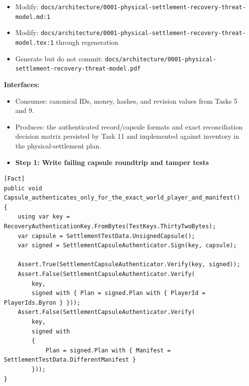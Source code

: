 \documentclass[
  10pt,
  letterpaper,
]{article}
\providecommand{\tightlist}{%
  \setlength{\itemsep}{0pt}\setlength{\parskip}{0pt}}
\begin{document}
\begin{itemize}
\item
  Modify:
  \texttt{docs/}\allowbreak{}\texttt{architecture/}\allowbreak{}\texttt{0001-}\allowbreak{}\texttt{physical-}\allowbreak{}\texttt{settlement-}\allowbreak{}\texttt{recovery-}\allowbreak{}\texttt{threat-}\allowbreak{}\texttt{model.}\allowbreak{}\texttt{md:}\allowbreak{}\texttt{1}
\item
  Modify:
  \texttt{docs/}\allowbreak{}\texttt{architecture/}\allowbreak{}\texttt{0001-}\allowbreak{}\texttt{physical-}\allowbreak{}\texttt{settlement-}\allowbreak{}\texttt{recovery-}\allowbreak{}\texttt{threat-}\allowbreak{}\texttt{model.}\allowbreak{}\texttt{tex:}\allowbreak{}\texttt{1}
  through regeneration
\item
  Generate but do not commit:
  \texttt{docs/}\allowbreak{}\texttt{architecture/}\allowbreak{}\texttt{0001-}\allowbreak{}\texttt{physical-}\allowbreak{}\texttt{settlement-}\allowbreak{}\texttt{recovery-}\allowbreak{}\texttt{threat-}\allowbreak{}\texttt{model.}\allowbreak{}\texttt{pdf}
\end{itemize}

\textbf{Interfaces:}

\begin{itemize}
\tightlist
\item
  Consumes: canonical IDs, money, hashes, and revision values from Tasks
  5 and 9.
\item
  Produces: the authenticated record/capsule formats and exact
  reconciliation decision matrix persisted by Task 11 and implemented
  against inventory in the physical-settlement plan.
\end{itemize}

\begin{itemize}
\tightlist
\item[$\square$]
  \textbf{Step 1: Write failing capsule roundtrip and tamper tests}
\end{itemize}

\begin{lstlisting}
[Fact]
public void Capsule_authenticates_only_for_the_exact_world_player_and_manifest()
{
    using var key = RecoveryAuthenticationKey.FromBytes(TestKeys.ThirtyTwoBytes);
    var capsule = SettlementTestData.UnsignedCapsule();
    var signed = SettlementCapsuleAuthenticator.Sign(key, capsule);

    Assert.True(SettlementCapsuleAuthenticator.Verify(key, signed));
    Assert.False(SettlementCapsuleAuthenticator.Verify(
        key,
        signed with { Plan = signed.Plan with { PlayerId = PlayerIds.Byron } }));
    Assert.False(SettlementCapsuleAuthenticator.Verify(
        key,
        signed with
        {
            Plan = signed.Plan with { Manifest = SettlementTestData.DifferentManifest }
        }));
}
\end{lstlisting}
\end{document}
